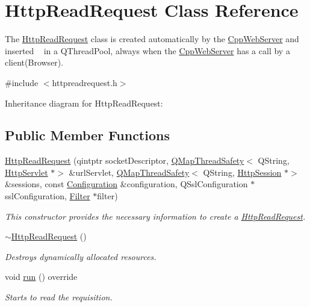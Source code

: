 \hypertarget{class_http_read_request}{}\section{Http\+Read\+Request Class Reference}
\label{class_http_read_request}


The \hyperlink{class_http_read_request}{Http\+Read\+Request} class is created automatically by the \hyperlink{class_cpp_web_server}{Cpp\+Web\+Server} and inserted ~\newline
 in a Q\+Thread\+Pool, always when the \hyperlink{class_cpp_web_server}{Cpp\+Web\+Server} has a call by a client(\+Browser).  




{\ttfamily \#include $<$httpreadrequest.\+h$>$}



Inheritance diagram for Http\+Read\+Request\+:
\subsection*{Public Member Functions}
\begin{DoxyCompactItemize}
\item 
\hyperlink{class_http_read_request_a640268a3a27663a31c642381a7cf03b4}{Http\+Read\+Request} (qintptr socket\+Descriptor, \hyperlink{class_q_map_thread_safety}{Q\+Map\+Thread\+Safety}$<$ Q\+String, \hyperlink{class_http_servlet}{Http\+Servlet} $\ast$$>$ \&url\+Servlet, \hyperlink{class_q_map_thread_safety}{Q\+Map\+Thread\+Safety}$<$ Q\+String, \hyperlink{class_http_session}{Http\+Session} $\ast$$>$ \&sessions, const \hyperlink{class_configuration}{Configuration} \&configuration, Q\+Ssl\+Configuration $\ast$ssl\+Configuration, \hyperlink{class_filter}{Filter} $\ast$filter)
\begin{DoxyCompactList}\small\item\em This constructor provides the necessary information to create a \hyperlink{class_http_read_request}{Http\+Read\+Request}. \end{DoxyCompactList}\item 
\mbox{\label{class_http_read_request_a876bcf62d5428d982c5af6f35e59b963}} 
\hyperlink{class_http_read_request_a876bcf62d5428d982c5af6f35e59b963}{$\sim$\+Http\+Read\+Request} ()
\begin{DoxyCompactList}\small\item\em Destroys dynamically allocated resources. \end{DoxyCompactList}\item 
\mbox{\label{class_http_read_request_a8db91de80ce8e83a3b89758a22eec5c3}} 
void \hyperlink{class_http_read_request_a8db91de80ce8e83a3b89758a22eec5c3}{run} () override
\begin{DoxyCompactList}\small\item\em Starts to read the requisition. \end{DoxyCompactList}\end{DoxyCompactItemize}


